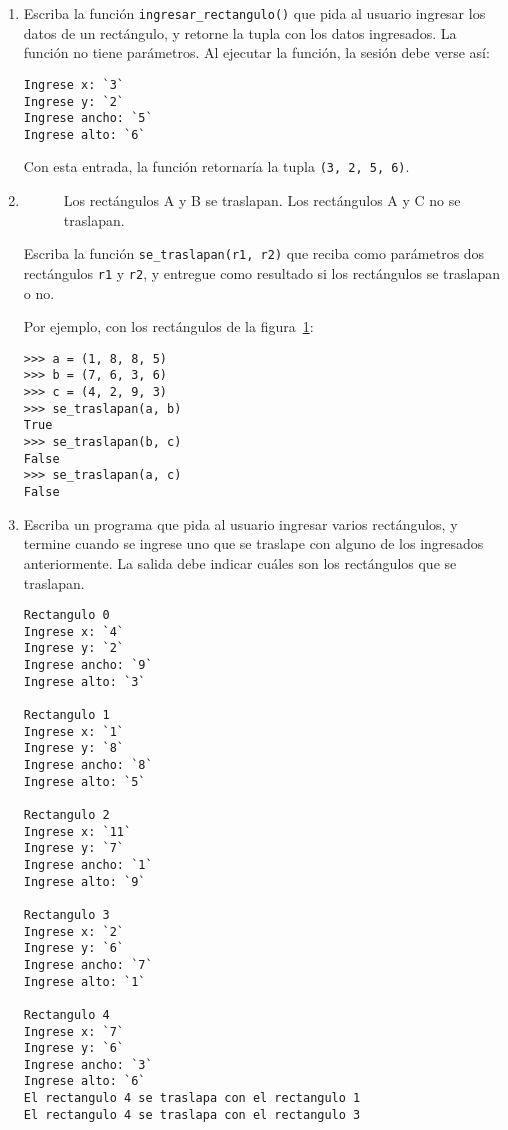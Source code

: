 \begin{enumerate}
\item
  Escriba la función \lstinline!ingresar_rectangulo()! que pida al
  usuario ingresar los datos de un rectángulo, y retorne la tupla con
  los datos ingresados. La función no tiene parámetros. Al ejecutar la
  función, la sesión debe verse así:

\begin{lstlisting}[language=testcase]
Ingrese x: `3`
Ingrese y: `2`
Ingrese ancho: `5`
Ingrese alto: `6`
\end{lstlisting}

  Con esta entrada, la función retornaría la tupla
  \lstinline!(3, 2, 5, 6)!.
\item

  \begin{figure}
    \centering
    
    \label{fig:rect2}
    \caption{Los rectángulos A y B se traslapan.
      Los rectángulos A y C no se traslapan.}
  \end{figure}

  Escriba la función \lstinline!se_traslapan(r1, r2)! que reciba como
  parámetros dos rectángulos \lstinline!r1! y \lstinline!r2!, y entregue
  como resultado si los rectángulos se traslapan o no.

  Por ejemplo, con los rectángulos de la figura~\ref{fig:rect2}:
\begin{lstlisting}
>>> a = (1, 8, 8, 5)
>>> b = (7, 6, 3, 6)
>>> c = (4, 2, 9, 3)
>>> se_traslapan(a, b)
True
>>> se_traslapan(b, c)
False
>>> se_traslapan(a, c)
False
\end{lstlisting}
\item
  Escriba un programa que pida al usuario ingresar varios rectángulos, y
  termine cuando se ingrese uno que se traslape con alguno de los
  ingresados anteriormente. La salida debe indicar cuáles son los
  rectángulos que se traslapan.

\begin{lstlisting}[language=testcase]
Rectangulo 0
Ingrese x: `4`
Ingrese y: `2`
Ingrese ancho: `9`
Ingrese alto: `3`

Rectangulo 1
Ingrese x: `1`
Ingrese y: `8`
Ingrese ancho: `8`
Ingrese alto: `5`

Rectangulo 2
Ingrese x: `11`
Ingrese y: `7`
Ingrese ancho: `1`
Ingrese alto: `9`

Rectangulo 3
Ingrese x: `2`
Ingrese y: `6`
Ingrese ancho: `7`
Ingrese alto: `1`

Rectangulo 4
Ingrese x: `7`
Ingrese y: `6`
Ingrese ancho: `3`
Ingrese alto: `6`
El rectangulo 4 se traslapa con el rectangulo 1
El rectangulo 4 se traslapa con el rectangulo 3
\end{lstlisting}


\end{enumerate}
